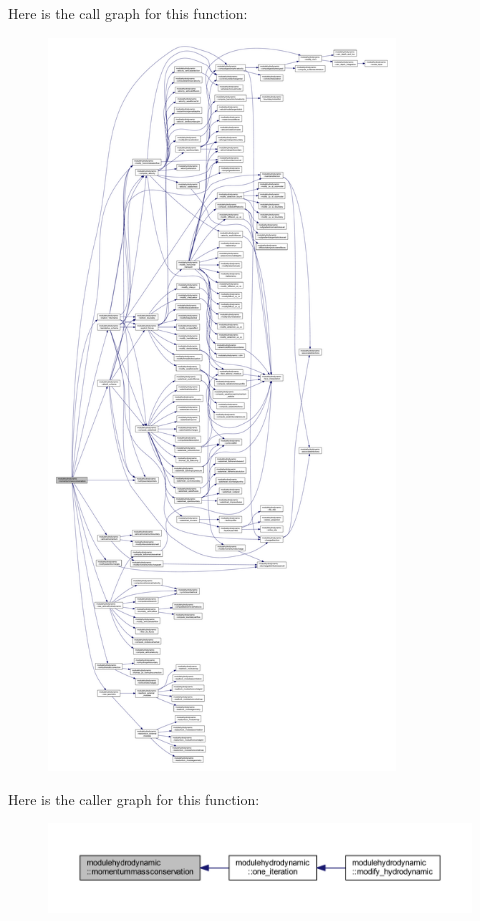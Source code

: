 Here is the call graph for this function\+:\nopagebreak
\begin{figure}[H]
\begin{center}
\leavevmode
\includegraphics[height=550pt]{namespacemodulehydrodynamic_aa05a995dd1f1f6550d1ecdfb0a0bab47_cgraph}
\end{center}
\end{figure}
Here is the caller graph for this function\+:\nopagebreak
\begin{figure}[H]
\begin{center}
\leavevmode
\includegraphics[width=350pt]{namespacemodulehydrodynamic_aa05a995dd1f1f6550d1ecdfb0a0bab47_icgraph}
\end{center}
\end{figure}
\mbox{\label{namespacemodulehydrodynamic_a348f4fbd3311ec9fc2bcc611faaa34be}} 
